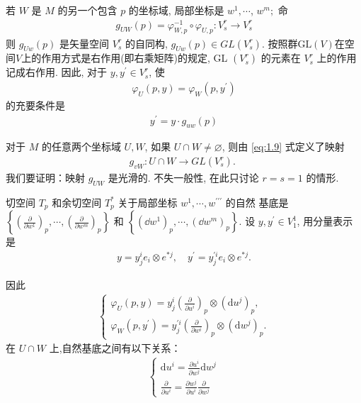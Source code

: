 若 $W$ 是 $M$ 的另一个包含 $p$ 的坐标域, 局部坐标是 $w^1, \cdots$, $w^m ;$ 命
\begin{align}\label{eq:1.9}
g_{U W}(p)=\varphi_{W, p}^{-1} \circ \varphi_{U, p}: V_s^r \rightarrow V_s^r
\end{align}
则 $g_{U w}(p)$ 是矢量空间 $V_s^r$ 的自同构, $g_{U w}(p) \in G L\left(V_s^r\right)$. 按照群$\mathrm{GL}(V)$在空间$V$上的作用方式是右作用(即右乘矩阵)的规定, GL $\left(V_s^r\right)$ 的元素在 $V_s^r$ 上的作用记成右作用. 因此, 对于 $y, y^{\prime} \in V_s^r$, 使
\begin{align}\label{eq:xingshen1.10}
\varphi_U(p, y)=\varphi_W\left(p, y^{\prime}\right)
\end{align}
的充要条件是
\begin{align}\label{eq:xingshen1.11}
y^{\prime}=y \cdot g_{u w}(p)
\end{align}

对于 $M$ 的任意两个坐标域 $U, W$, 如果 $U \cap W \neq \varnothing$, 则由 \eqref{eq:1.9} 式定义了映射
\begin{align*}
g_{v W}: U \cap W \rightarrow G L\left(V_s^r\right) \text {. }
\end{align*}
我们要证明：映射 $g_{UW}$ 是光滑的. 不失一般性, 在此只讨论 $r=s=1$ 的情形.

切空间 $T_p$ 和余切空间 $T_p^*$ 关于局部坐标 $w^1, \cdots, w^{\prime \prime \prime}$ 的自然 基底是 $\textstyle\left\{\left(\frac{\partial}{\partial w^1}\right)_p, \cdots,\left(\frac{\partial}{\partial w^m}\right)_p\right\}$ 和 $\left\{\left(\dd w^1\right)_p, \cdots,\left(\dd w^{m}\right)_p\right\}$. 设 $y, y^{\prime} \in V_1^{1}$, 用分量表示是
\begin{align*}
y=y_j^i e_i \otimes e^{* j}, \quad y^{\prime}=y_j^{\prime i} e_i \otimes e^{* j} .
\end{align*}

因此
\begin{equation}\label{eq:xingshen1.14}
    \begin{aligned}
\left\{\begin{array}{l}
\varphi_U(p, y)=y^i_j\left(\frac{\partial}{\partial u^i}\right)_p \otimes\left(\mathrm{d} u^{j}\right)_p, \\
\varphi_W\left(p, y^{\prime}\right)=y_j^{\prime i}\left(\frac{\partial}{\partial w^i}\right)_p \otimes\left(\mathrm{d} w^j\right)_p .
\end{array}\right.
\end{aligned}
\end{equation}
在 $U \cap W$ 上,自然基底之间有以下关系：
\begin{equation}\label{eq:xingshen1.15}
    \begin{aligned}
\left\{\begin{array}{l}
\mathrm{d} u^{i}=\frac{\partial u^i}{\partial w^{j}} \mathrm{d} w^j \\
\frac{\partial}{\partial u^i}=\frac{\partial w^{j}}{\partial u^i} \frac{\partial}{\partial w^{j}}
\end{array}\right.
\end{aligned}
\end{equation}

